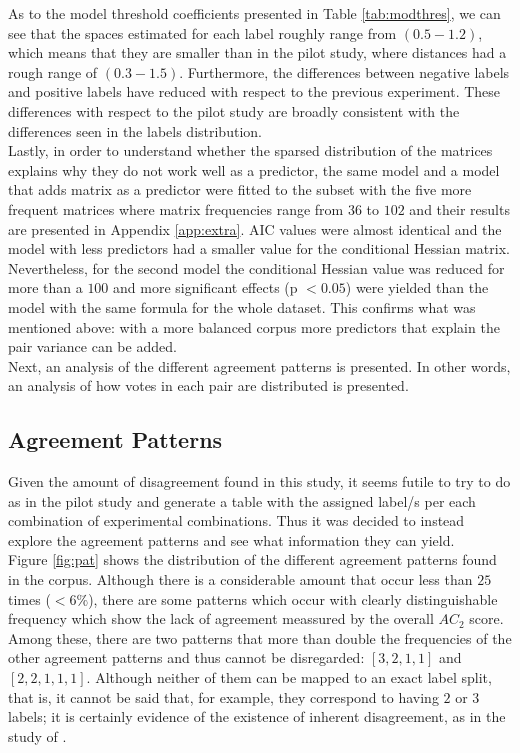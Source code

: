As to the model threshold coefficients presented in Table \ref{tab:modthres}, we can see that the spaces estimated for each label roughly range from $(0.5-1.2)$, which means that they are smaller than in the pilot study, where distances had a rough range of $(0.3-1.5)$. Furthermore, the differences between negative labels and positive labels have reduced with respect to the previous experiment. These differences with respect to the pilot study are broadly consistent with the differences seen in the labels distribution.\\

Lastly, in order to understand whether the sparsed distribution of the matrices explains why they do not work well as a predictor, the same model and a model that adds matrix as a predictor were fitted to the subset with the five more frequent matrices where matrix frequencies range from $36$ to $102$ and their results are presented in Appendix \ref{app:extra}. AIC values were almost identical and the model with less predictors had a smaller value for the conditional Hessian matrix. Nevertheless, for the second model the conditional Hessian value was reduced for more than a $100$ and more significant effects (p $<0.05$) were yielded than the model with the same formula for the whole dataset. This confirms what was mentioned above: with a more balanced corpus more predictors that explain the pair variance can be added.\\

Next, an analysis of the different agreement patterns is presented. In other words, an analysis of how votes in each pair are distributed is presented.\\

\subsection{Agreement Patterns}\label{subsect:agrepat}

Given the amount of disagreement found in this study, it seems futile to try to do as in the pilot study and generate a table with the assigned label/s per each combination of experimental combinations. Thus it was decided to instead explore the agreement patterns and see what information they can yield.\\

Figure \ref{fig:pat} shows the distribution of the different agreement patterns found in the corpus. Although there is a considerable amount that occur less than $25$ times ($<6\%$), there are some patterns which occur with clearly distinguishable frequency which show the lack of agreement meassured by the overall $AC_2$ score. Among these, there are two patterns that more than double the frequencies of the other agreement patterns and thus cannot be disregarded: $[3,2,1,1]$ and $[2,2,1,1,1]$. Although neither of them can be mapped to an exact label split, that is, it cannot be said that, for example, they correspond to having $2$ or $3$ labels; it is certainly evidence of the existence of inherent disagreement, as in the study of \citet{pavlick2019inherent}.\\

